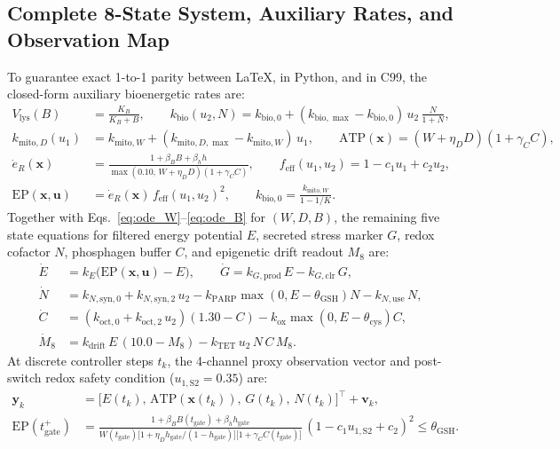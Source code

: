 \documentclass[11pt]{article}
\theoremstyle{plain}
\theoremstyle{remark}
\begin{document}
\subsection{Complete 8-State System, Auxiliary Rates, and Observation Map}
\label{app:model}
To guarantee exact 1-to-1 parity between \LaTeX,  in Python, and  in C99, the closed-form auxiliary bioenergetic rates are:
\begin{align}
  V_{\mathrm{lys}}(B) &= \frac{K_B}{K_B + B}, \qquad
  k_{\mathrm{bio}}(u_2, N) = k_{\mathrm{bio},0} + (k_{\mathrm{bio},\max} - k_{\mathrm{bio},0})\,u_2\,\frac{N}{1 + N}, \label{eq:aux_kbio} \\
  k_{\mathrm{mito},D}(u_1) &= k_{\mathrm{mito},W} + (k_{\mathrm{mito},D,\max} - k_{\mathrm{mito},W})\,u_1, \qquad
  \mathrm{ATP}(\mathbf{x}) = (W + \eta_D D)(1 + \gamma_C C), \label{eq:aux_atp} \\
  \dot{e}_R(\mathbf{x}) &= \frac{1 + \beta_B B + \beta_h h}{\max(0.10,\, W + \eta_D D)(1 + \gamma_C C)}, \qquad
  f_{\mathrm{eff}}(u_1, u_2) = 1 - c_1 u_1 + c_2 u_2, \label{eq:aux_er} \\
  \mathrm{EP}(\mathbf{x}, \mathbf{u}) &= \dot{e}_R(\mathbf{x})\,f_{\mathrm{eff}}(u_1, u_2)^2, \qquad
  k_{\mathrm{bio},0} = \frac{k_{\mathrm{mito},W}}{1 - 1/K}. \label{eq:aux_ep}
\end{align}
Together with Eqs.~\eqref{eq:ode_W}--\eqref{eq:ode_B} for $(W, D, B)$, the remaining five state equations for filtered energy potential $E$, secreted stress marker $G$, redox cofactor $N$, phosphagen buffer $C$, and epigenetic drift readout $M_8$ are:
\begin{align}
  \dot{E} &= k_E\big(\mathrm{EP}(\mathbf{x}, \mathbf{u}) - E\big), \qquad
  \dot{G} = k_{G,\mathrm{prod}}\,E - k_{G,\mathrm{clr}}\,G, \label{eq:ode_EG} \\
  \dot{N} &= k_{N,\mathrm{syn},0} + k_{N,\mathrm{syn},2}\,u_2 - k_{\mathrm{PARP}}\max(0, E - \theta_{\mathrm{GSH}})N - k_{N,\mathrm{use}}\,N, \label{eq:ode_N} \\
  \dot{C} &= (k_{\mathrm{oct},0} + k_{\mathrm{oct},2}\,u_2)(1.30 - C) - k_{\mathrm{ox}}\max(0, E - \theta_{\mathrm{cys}})C, \label{eq:ode_C} \\
  \dot{M}_8 &= k_{\mathrm{drift}}\,E\,(10.0 - M_8) - k_{\mathrm{TET}}\,u_2\,N\,C\,M_8. \label{eq:ode_M8}
\end{align}
At discrete controller steps $t_k$, the 4-channel proxy observation vector and post-switch redox safety condition ($u_{1,\mathrm{S2}} = 0.35$) are:
\begin{align}
  \mathbf{y}_k &= \big[E(t_k),\, \mathrm{ATP}(\mathbf{x}(t_k)),\, G(t_k),\, N(t_k)\big]^\top + \mathbf{v}_k, \label{eq:observation_model} \\
  \mathrm{EP}(t_{\mathrm{gate}}^+) &= \frac{1 + \beta_B B(t_{\mathrm{gate}}) + \beta_h h_{\mathrm{gate}}}{W(t_{\mathrm{gate}})\big[1 + \eta_D h_{\mathrm{gate}}/(1 - h_{\mathrm{gate}})\big]\big[1 + \gamma_C C(t_{\mathrm{gate}})\big]}\,(1 - c_1 u_{1,\mathrm{S2}} + c_2)^2 \le \theta_{\mathrm{GSH}}. \label{eq:hgate_derivation}
\end{align}
\end{document}
